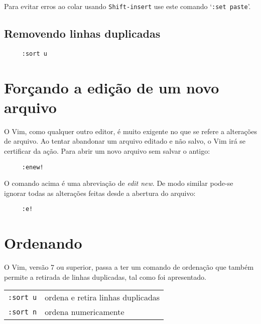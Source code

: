 {\Large {}} Para evitar erros ao colar usando {\tt Shift-insert} 
use este comando `{\tt :set paste}'.

\subsection{Removendo linhas duplicadas}
\begin{verbatim}
     :sort u
\end{verbatim}

\section{Forçando a edição de um novo arquivo}\label{sec:Forçando a edição de um novo arquivo}

O Vim, como qualquer outro editor, é muito exigente no que se refere a alterações
de arquivo.  Ao tentar abandonar um arquivo editado e não salvo, o Vim irá se certificar
da ação. Para abrir um novo arquivo sem salvar o antigo:

\begin{verbatim}
     :enew!
\end{verbatim}

O comando acima é uma abreviação de {\em edit new}. De modo similar pode-se
ignorar todas as alterações feitas desde a abertura do arquivo:

\begin{verbatim}
     :e!
\end{verbatim}

\section{Ordenando}

O Vim, versão 7 ou superior, passa a ter um comando de ordenação que também 
permite a retirada de linhas duplicadas, tal como foi apresentado.
\begin{table}[htb]\begin{center} \begin{tabular}{ll} \hline
     \verb|:sort u| & ordena e retira linhas duplicadas\\
     \verb|:sort n| & ordena numericamente\\
\hline \end{tabular}\end{center}\end{table}

